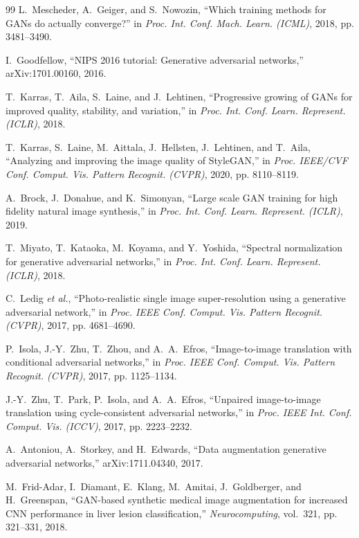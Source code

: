 \documentclass[conference]{IEEEtran}
\theoremstyle{plain}
\theoremstyle{definition}
\begin{document}
\begin{thebibliography}{99}
 L.~Mescheder, A.~Geiger, and S.~Nowozin, ``Which training methods for GANs do actually converge?'' in \emph{Proc. Int. Conf. Mach. Learn. (ICML)}, 2018, pp. 3481--3490.

 I.~Goodfellow, ``NIPS 2016 tutorial: Generative adversarial networks,'' arXiv:1701.00160, 2016.

 T.~Karras, T.~Aila, S.~Laine, and J.~Lehtinen, ``Progressive growing of GANs for improved quality, stability, and variation,'' in \emph{Proc. Int. Conf. Learn. Represent. (ICLR)}, 2018.

 T.~Karras, S.~Laine, M.~Aittala, J.~Hellsten, J.~Lehtinen, and T.~Aila, ``Analyzing and improving the image quality of StyleGAN,'' in \emph{Proc. IEEE/CVF Conf. Comput. Vis. Pattern Recognit. (CVPR)}, 2020, pp. 8110--8119.

 A.~Brock, J.~Donahue, and K.~Simonyan, ``Large scale GAN training for high fidelity natural image synthesis,'' in \emph{Proc. Int. Conf. Learn. Represent. (ICLR)}, 2019.

 T.~Miyato, T.~Kataoka, M.~Koyama, and Y.~Yoshida, ``Spectral normalization for generative adversarial networks,'' in \emph{Proc. Int. Conf. Learn. Represent. (ICLR)}, 2018.

 C.~Ledig \emph{et al.}, ``Photo-realistic single image super-resolution using a generative adversarial network,'' in \emph{Proc. IEEE Conf. Comput. Vis. Pattern Recognit. (CVPR)}, 2017, pp. 4681--4690.

 P.~Isola, J.-Y.~Zhu, T.~Zhou, and A.~A.~Efros, ``Image-to-image translation with conditional adversarial networks,'' in \emph{Proc. IEEE Conf. Comput. Vis. Pattern Recognit. (CVPR)}, 2017, pp. 1125--1134.

 J.-Y.~Zhu, T.~Park, P.~Isola, and A.~A.~Efros, ``Unpaired image-to-image translation using cycle-consistent adversarial networks,'' in \emph{Proc. IEEE Int. Conf. Comput. Vis. (ICCV)}, 2017, pp. 2223--2232.

 A.~Antoniou, A.~Storkey, and H.~Edwards, ``Data augmentation generative adversarial networks,'' arXiv:1711.04340, 2017.

 M.~Frid-Adar, I.~Diamant, E.~Klang, M.~Amitai, J.~Goldberger, and H.~Greenspan, ``GAN-based synthetic medical image augmentation for increased CNN performance in liver lesion classification,'' \emph{Neurocomputing}, vol.~321, pp. 321--331, 2018.


\end{thebibliography}
\end{document}
